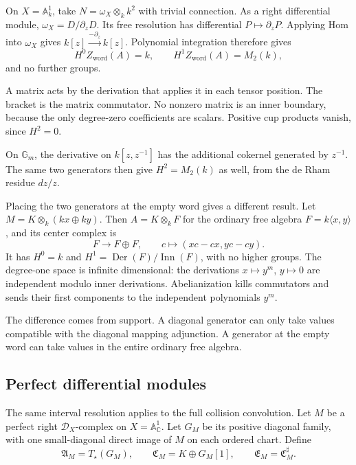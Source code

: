 \begin{example}
\label{v4-arith:centers:ex:diagonal-generators}
On $X=\mathbb A^1_k$, take
$N=\omega_X\otimes_k k^2$ with trivial
connection. As a right differential
module,
$\omega_X=D/\partial_zD$.
Its free resolution has differential
$P\mapsto\partial_zP$.
Applying Hom into $\omega_X$ gives
$k[z]\xrightarrow{-\partial_z}k[z]$.
Polynomial integration therefore gives
\[
 H^0Z_{\mathrm{word}}(A)=k,\qquad
 H^1Z_{\mathrm{word}}(A)=M_2(k),
\]
and no further groups.

A matrix acts by the derivation that
applies it in each tensor position.
The bracket is the matrix commutator.
No nonzero matrix is an inner boundary,
because the only degree-zero coefficients
are scalars. Positive cup products
vanish, since $H^2=0$.

On $\mathbb G_m$, the derivative on
$k[z,z^{-1}]$ has the additional
cokernel generated by $z^{-1}$.
The same two generators then give
$H^2=M_2(k)$ as well, from the
de Rham residue $dz/z$.
\end{example}

Placing the two generators at the
empty word gives a different result.
Let $M=K\otimes_k(kx\oplus ky)$.
Then $A=K\otimes_k F$ for the ordinary
free algebra $F=k\langle x,y\rangle$,
and its center complex is
\[
 F\longrightarrow F\oplus F,\qquad
 c\longmapsto(xc-cx,yc-cy).
\]
It has $H^0=k$ and
$H^1=\operatorname{Der}(F)/\operatorname{Inn}(F)$,
with no higher groups.
The degree-one space is infinite
dimensional: the derivations
$x\mapsto y^m$, $y\mapsto0$ are
independent modulo inner derivations.
Abelianization kills commutators
and sends their first components
to the independent polynomials
$y^m$.

The difference comes from support.
A diagonal generator can only take
values compatible with the diagonal
mapping adjunction. A generator
at the empty word can take values
in the entire ordinary free algebra.

\subsection{Perfect differential modules}
\label{v4-arith:centers:subsec:perfect-current}

The same interval resolution applies
to the full collision convolution.
Let $M$ be a perfect right
$\mathcal D_X$-complex on
$X=\mathbb A^1_{\mathbb C}$.
Let $G_M$ be its positive diagonal
family, with one small-diagonal
direct image of $M$ on each ordered
chart. Define
\[
 \mathfrak A_M=T_\star(G_M),\qquad
 \mathfrak C_M=K\oplus G_M[1],\qquad
 \mathfrak E_M=\mathfrak C_M^\sharp.
\]

